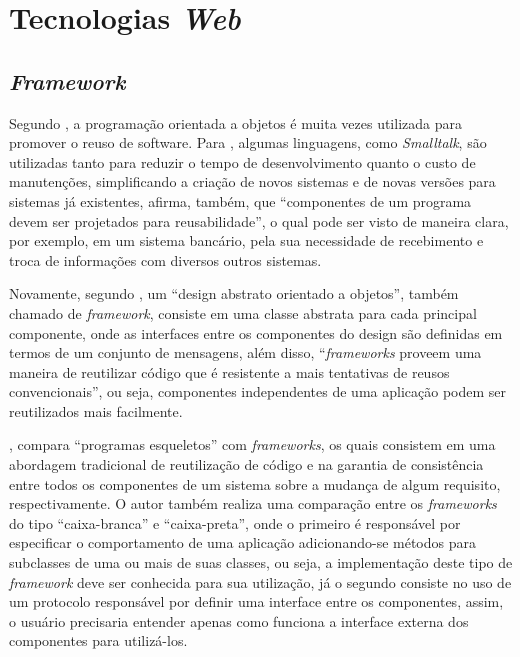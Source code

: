 \chapter{Tecnologias \textit{Web}}

\section{\textit{Framework}}
Segundo , a programação orientada a objetos é muita vezes utilizada para promover o reuso de software. Para , algumas linguagens, como \textit{Smalltalk}, são utilizadas tanto para reduzir o tempo de desenvolvimento quanto o custo de manutenções, simplificando a criação de novos sistemas e de novas versões para sistemas já existentes, afirma, também, que “componentes de um programa devem ser projetados para reusabilidade”, o qual pode ser visto de maneira clara, por exemplo, em um sistema bancário, pela sua necessidade de recebimento e troca de informações com diversos outros sistemas.

Novamente, segundo , um “design abstrato orientado a objetos”, também chamado de \textit{framework}, consiste em uma classe abstrata para cada principal componente, onde as interfaces entre os componentes do design são definidas em termos de um conjunto de mensagens, além disso, “\textit{frameworks} proveem uma maneira de reutilizar código que é resistente a mais tentativas de reusos convencionais”, ou seja, componentes independentes de uma aplicação podem ser reutilizados mais facilmente.

, compara “programas esqueletos” com \textit{frameworks}, os quais consistem em uma abordagem tradicional de reutilização de código e na garantia de consistência entre todos os componentes de um sistema sobre a mudança de algum requisito, respectivamente. O autor também realiza uma comparação entre os \textit{frameworks} do tipo “caixa-branca” e “caixa-preta”, onde o primeiro é responsável por especificar o comportamento de uma aplicação adicionando-se métodos para subclasses de uma ou mais de suas classes, ou seja, a implementação deste tipo de \textit{framework} deve ser conhecida para sua utilização, já o segundo consiste no uso de um protocolo responsável por definir uma interface entre os componentes, assim, o usuário precisaria entender apenas como funciona a interface externa dos componentes para utilizá-los.

